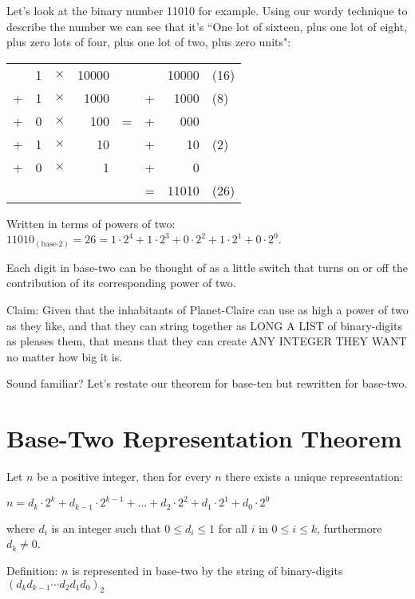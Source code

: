 \documentclass{article}
\newenvironment{jprIn}{\begin{adjustwidth}{2em}{}}{\end{adjustwidth}}
\begin{document}
Let's look at the binary number 11010 for example.
Using our wordy technique to describe the number
we can see that it's ``One lot of sixteen,
plus one lot of eight, plus zero lots of four,
plus one lot of two, plus zero units": 
\begin{center}
\begin{tabular}{r r r r c r r l}
\phantom & 1 & $\times$ & 10000 & \phantom & \phantom & 10000 & (16)\\
+ & 1 & $\times$ & 1000 & \phantom & + & 1000 & (8)\\
+ & 0 & $\times$ & 100 & \; \; = \; \; & + & 000 & \\
+ & 1 & $\times$ & 10 & \phantom & + & 10 & (2)\\
+ & 0 & $\times$ & 1 & \phantom & + & 0\\
\cline{6-8}
\phantom & \phantom & \phantom & \phantom & \phantom & = & 11010 & (26)\\
\end{tabular}
\end{center}
Written in terms of powers of two: $11010_{(\text{base-2})}=26=1\cdot2^4+1\cdot2^3+0\cdot2^2+1\cdot2^1+0\cdot2^0$.

Each digit in base-two can be thought of as a little switch that
turns on or off the contribution of its corresponding power of two.

Claim: Given that the inhabitants of Planet-Claire can use as high a power of two as they like,
and that they can string together as LONG A LIST of binary-digits as pleases them,
that means that they can create ANY INTEGER THEY WANT no matter how big it is.

Sound familiar? Let's restate our theorem for base-ten but rewritten for base-two.

\section*{Base-Two Representation Theorem}

\begin{jprIn}
Let $n$ be a positive integer, then for every $n$ there exists a unique representation:

\hspace{3em}$n=d_k\cdot{}2^k+d_{k-1}\cdot{}2^{k-1}+\dots+d_2\cdot{}2^2+d_1\cdot{}2^1+d_0\cdot{}2^0$

where $d_i$ is an integer such that $0\le{}d_i\le{}1$ for all $i$ in $0\le{}i\le{}k$, furthermore $d_k\ne0$.

Definition: $n$ is represented in base-two by the string of binary-digits $(d_kd_{k-1}{\cdots}d_2d_1d_0)_2$
\end{jprIn}
\bigskip
\end{document}
